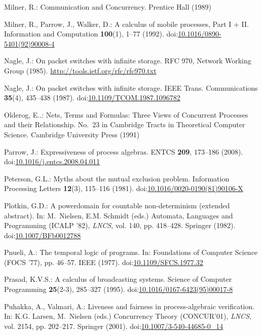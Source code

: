 \documentclass[smallcondensed]{svjour3}
\providecommand{\urlalt}[2]{\href{#1}{#2}}
\providecommand{\doi}[1]{doi:\urlalt{http://dx.doi.org/#1}{#1}}
\begin{document}
\begin{thebibliography}{10}
Milner, R.: Communication and Concurrency.
\newblock Prentice Hall (1989)

Milner, R., Parrow, J., Walker, D.: A calculus of mobile processes, {Part I +
  II}.
\newblock Information and Computation \textbf{100}(1), 1--77 (1992).
\newblock \doi{10.1016/0890-5401(92)90008-4}

Nagle, J.: On packet switches with infinite storage.
\newblock RFC 970, Network Working Group (1985).
\newblock \urlprefix\url{http://tools.ietf.org/rfc/rfc970.txt}

Nagle, J.: On packet switches with infinite storage.
\newblock IEEE Trans. Communications \textbf{35}(4), 435--438 (1987).
\newblock \doi{10.1109/TCOM.1987.1096782}

Olderog, E.{\Ruediger}.: Nets, Terms and Formulas: Three Views of Concurrent
  Processes and their Relationship.
\newblock No.~23 in Cambridge Tracts in Theoretical Computer Science. Cambridge
  University Press (1991)

Parrow, J.: Expressiveness of process algebras.
\newblock \rm ENTCS \textbf{209}, 173--186 (2008).
\newblock \doi{10.1016/j.entcs.2008.04.011}

Peterson, G.L.: Myths about the mutual exclusion problem.
\newblock Information Processing Letters \textbf{12}(3), 115--116 (1981).
\newblock \doi{10.1016/0020-0190(81)90106-X}

Plotkin, G.D.: A powerdomain for countable non-determinism (extended abstract).
\newblock In: M.~Nielsen, E.M. Schmidt (eds.) Automata, Languages and
  Programming (ICALP '82), \emph{\rm LNCS}, vol. 140, pp. 418--428. Springer
  (1982).
\newblock \doi{10.1007/BFb0012788}

Pnueli, A.: The temporal logic of programs.
\newblock In: Foundations of Computer Science {(FOCS '77)}, pp. 46--57. IEEE
  (1977).
\newblock \doi{10.1109/SFCS.1977.32}

Prasad, K.V.S.: A calculus of broadcasting systems.
\newblock Science of Computer Programming \textbf{25}(2-3), 285--327 (1995).
\newblock \doi{10.1016/0167-6423(95)00017-8}

Puhakka, A., Valmari, A.: Liveness and fairness in process-algebraic
  verification.
\newblock In: K.G. Larsen, M.~Nielsen (eds.) Concurrency Theory (CONCUR'01),
  \emph{\rm LNCS}, vol. 2154, pp. 202--217. Springer (2001).
\newblock \doi{10.1007/3-540-44685-0\_14}


\end{thebibliography}
\end{document}
